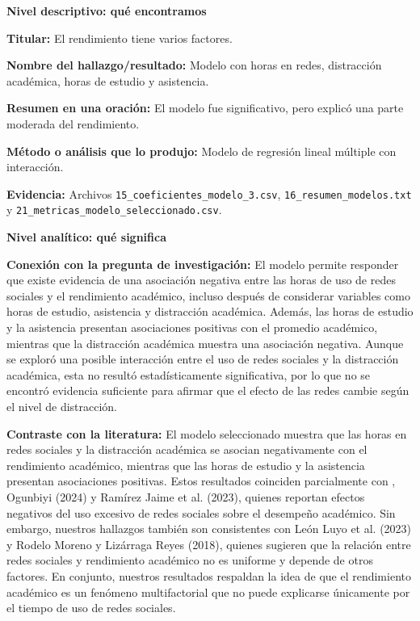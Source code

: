 \documentclass[12pt]{article}
\begin{document}
\begin{tcolorbox}[
colback=blue!5,
colframe=blue!75!black,
title=Ficha 9. Modelo seleccionado]

\textbf{Nivel descriptivo: qué encontramos}

\textbf{Titular:} El rendimiento tiene varios factores.

\textbf{Nombre del hallazgo/resultado:} Modelo con horas en redes, distracción académica, horas de estudio y asistencia.

\textbf{Resumen en una oración:} El modelo fue significativo, pero explicó una parte moderada del rendimiento.

\textbf{Método o análisis que lo produjo:} Modelo de regresión lineal múltiple con interacción.

\textbf{Evidencia:} Archivos \texttt{15\_coeficientes\_modelo\_3.csv}, \texttt{16\_resumen\_modelos.txt} y \texttt{21\_metricas\_modelo\_seleccionado.csv}.

\textbf{Nivel analítico: qué significa}

\textbf{Conexión con la pregunta de investigación:} El modelo permite responder que existe evidencia de una asociación negativa entre las horas de uso de redes sociales y el rendimiento académico, incluso después de considerar variables como horas de estudio, asistencia y distracción académica. Además, las horas de estudio y la asistencia presentan asociaciones positivas con el promedio académico, mientras que la distracción académica muestra una asociación negativa. Aunque se exploró una posible interacción entre el uso de redes sociales y la distracción académica, esta no resultó estadísticamente significativa, por lo que no se encontró evidencia suficiente para afirmar que el efecto de las redes cambie según el nivel de distracción.

\textbf{Contraste con la literatura:} El modelo seleccionado muestra que las horas en redes sociales y la distracción académica se asocian negativamente con el rendimiento académico, mientras que las horas de estudio y la asistencia presentan asociaciones positivas. Estos resultados coinciden parcialmente con \cite{aljemely2020}, Ogunbiyi (2024) y Ramírez Jaime et al. (2023), quienes reportan efectos negativos del uso excesivo de redes sociales sobre el desempeño académico. Sin embargo, nuestros hallazgos también son consistentes con León Luyo et al. (2023) y Rodelo Moreno y Lizárraga Reyes (2018), quienes sugieren que la relación entre redes sociales y rendimiento académico no es uniforme y depende de otros factores. En conjunto, nuestros resultados respaldan la idea de que el rendimiento académico es un fenómeno multifactorial que no puede explicarse únicamente por el tiempo de uso de redes sociales.


\end{tcolorbox}
\end{document}
